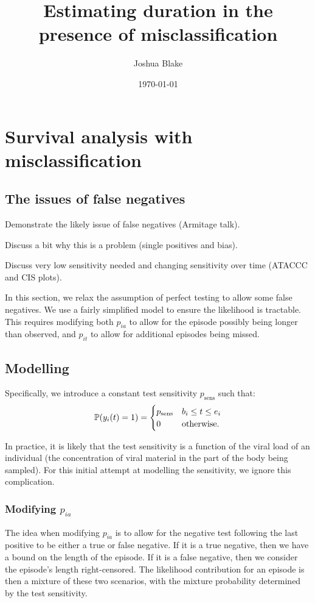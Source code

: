 \documentclass[thesis.tex]{subfiles}
\title{Estimating duration in the presence of misclassification}
\author{Joshua Blake}
\date{\today}
\begin{document}
\chapter{Survival analysis with misclassification} \label{imperf-test}

\section{The issues of false negatives}

Demonstrate the likely issue of false negatives (Armitage talk).

Discuss a bit why this is a problem (single positives and bias).

Discuss very low sensitivity needed and changing sensitivity over time (ATACCC and CIS plots).

In this section, we relax the assumption of perfect testing to allow
some false negatives. We use a fairly simplified model to ensure the
likelihood is tractable. This requires modifying both $p_{ia}$ to
allow for the episode possibly being longer than observed, and
$p_{it}$ to allow for additional episodes being missed.

\section{Modelling}

Specifically, we introduce a constant test sensitivity $p_\text{sens}$
such that:
\begin{align}
\operatorname{\mathbb{P}}(y_i(t) = 1) = \begin{cases} p_\text{sens} &b_i \leq t \leq e_i \\ 0 &\text{otherwise.}\end{cases}
\end{align}

In practice, it is likely that the test sensitivity is a function of the
viral load of an individual (the concentration of viral material in the
part of the body being sampled). For this initial attempt at modelling
the sensitivity, we ignore this complication.

\subsection{Modifying $p_{ia}$} \label{modifying-p_ia}

The idea when modifying $p_{ia}$ is to allow for the negative test
following the last positive to be either a true or false negative. If it
is a true negative, then we have a bound on the length of the episode.
If it is a false negative, then we consider the episode's length
right-censored. The likelihood contribution for an episode is then a
mixture of these two scenarios, with the mixture probability determined
by the test sensitivity.
\end{document}
